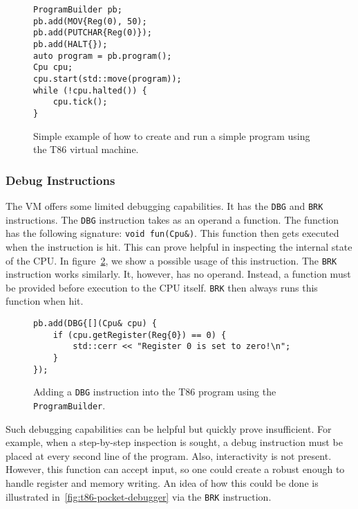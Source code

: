 \begin{figure}
    \begin{verbatim}
ProgramBuilder pb;
pb.add(MOV{Reg(0), 50);
pb.add(PUTCHAR{Reg(0)});
pb.add(HALT{});
auto program = pb.program();
Cpu cpu;
cpu.start(std::move(program));
while (!cpu.halted()) {
    cpu.tick();
}
    \end{verbatim}
    \caption{Simple example of how to create and run a simple program using the
    T86 virtual machine.}
    \label{fig:t86-intro}
\end{figure}

\subsubsection{Debug Instructions}\label{section:t86-debug-cap}
The VM offers some limited debugging capabilities. It has the \texttt{DBG} and
\texttt{BRK} instructions. The \texttt{DBG} instruction takes as an operand a
function. The function has the following signature: \texttt{void fun(Cpu\&)}.
This function then gets executed when the instruction is hit. This can prove
helpful in inspecting the internal state of the CPU. In
figure~\ref{fig:t86-debug}, we show a possible usage of this instruction. The
\texttt{BRK} instruction works similarly. It, however, has no operand. Instead,
a function must be provided before execution to the CPU itself. \texttt{BRK}
then always runs this function when hit.

\begin{figure}
    \begin{verbatim}
pb.add(DBG{[](Cpu& cpu) {
    if (cpu.getRegister(Reg{0}) == 0) {
        std::cerr << "Register 0 is set to zero!\n";
    }
});
    \end{verbatim}
    \caption{Adding a \texttt{DBG} instruction into the T86 program using the
    \texttt{ProgramBuilder}.}
    \label{fig:t86-debug}
\end{figure}

Such debugging capabilities can be helpful but quickly prove insufficient. For
example, when a step-by-step inspection is sought, a debug instruction must be
placed at every second line of the program. Also, interactivity is not present.
However, this function can accept input, so one could create a robust enough to
handle register and memory writing. An idea of how this could be done is
illustrated in~\ref{fig:t86-pocket-debugger} via the \texttt{BRK} instruction.

